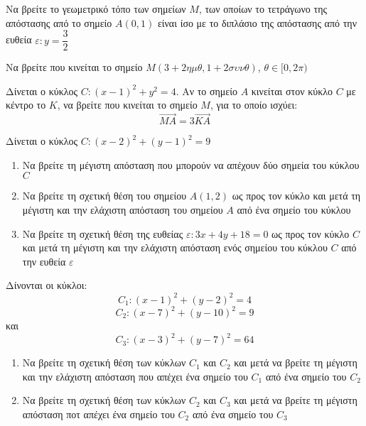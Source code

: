 \documentclass{../../presentation}
\begin{document}
\begin{askisi}
  Να βρείτε το γεωμετρικό τόπο των σημείων $Μ$, των οποίων το τετράγωνο της απόστασης από το σημείο $Α(0,1)$ είναι ίσο με το διπλάσιο της απόστασης από την ευθεία $ε:y=\dfrac{3}{2}$

\end{askisi}

\begin{askisi}
  Να βρείτε που κινείται το σημείο $Μ(3+2ημθ,1+2συνθ)$, $θ\in [0,2π)$

\end{askisi}

\begin{askisi}
  Δίνεται ο κύκλος $C:(x-1)^2+y^2=4$. Αν το σημείο $Α$ κινείται στον κύκλο $C$ με κέντρο το $Κ$, να βρείτε που κινείται το σημείο $Μ$, για το οποίο ισχύει:
  $$\overrightarrow{ΜΑ}=3\overrightarrow{ΚΑ}$$

\end{askisi}

\begin{askisi}
  Δίνεται ο κύκλος $C:(x-2)^2+(y-1)^2=9$
  \begin{enumerate}
    \item<1-> Να βρείτε τη μέγιστη απόσταση που μπορούν να απέχουν δύο σημεία του κύκλου $C$
    \item<2-> Να βρείτε τη σχετική θέση του σημείου $Α(1,2)$ ως προς τον κύκλο και μετά τη μέγιστη και την ελάχιστη απόσταση του σημείου $Α$ από ένα σημείο του κύκλου
    \item<3-> Να βρείτε τη σχετική θέση της ευθείας $ε:3x+4y+18=0$ ως προς τον κύκλο $C$ και μετά τη μέγιστη και την ελάχιστη απόσταση ενός σημείου του κύκλου $C$ από την ευθεία $ε$
  \end{enumerate}

\end{askisi}

\begin{askisi}
  Δίνονται οι κύκλοι:
  $$C_1:(x-1)^2+(y-2)^2=4$$
  $$C_2:(x-7)^2+(y-10)^2=9$$
  και
  $$C_3:(x-3)^2+(y-7)^2=64$$
  \begin{enumerate}
    \item<1-> Να βρείτε τη σχετική θέση των κύκλων $C_1$ και $C_2$ και μετά να βρείτε τη μέγιστη και την ελάχιστη απόσταση που απέχει ένα σημείο του $C_1$ από ένα σημείο του $C_2$
    \item<2-> Να βρείτε τη σχετική θέση των κύκλων $C_2$ και $C_3$ και μετά να βρείτε τη μέγιστη απόσταση ποτ απέχει ένα σημείο του $C_2$ από ένα σημείο του $C_3$
  \end{enumerate}

\end{askisi}
\end{document}
